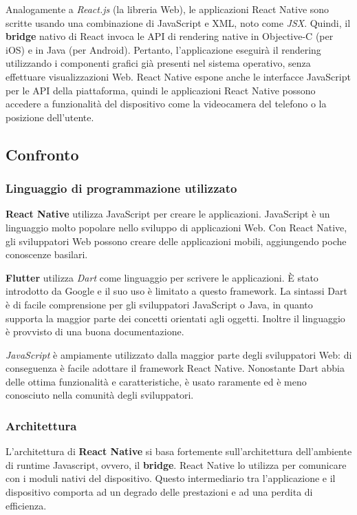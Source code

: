 Analogamente a \textit{React.js} (la libreria Web), le applicazioni React Native sono scritte usando una combinazione di JavaScript e XML, noto come \textit{JSX}. Quindi, il \textbf{bridge} nativo di React invoca le API di rendering native in Objective-C (per iOS) e in Java (per Android). Pertanto, l'applicazione eseguirà il rendering utilizzando i componenti grafici già presenti nel sistema operativo, senza effettuare visualizzazioni Web. React Native espone anche le interfacce JavaScript per le API della piattaforma, quindi le applicazioni React Native possono accedere a funzionalità del dispositivo come la videocamera del telefono o la posizione dell'utente.

\subsection{Confronto}

\subsubsection{Linguaggio di programmazione utilizzato}
\textbf{React Native} utilizza JavaScript per creare le applicazioni. JavaScript è un linguaggio molto popolare nello sviluppo di applicazioni Web. Con React Native, gli sviluppatori Web possono creare delle applicazioni mobili, aggiungendo poche conoscenze basilari.

\textbf{Flutter} utilizza \textit{Dart} come linguaggio per scrivere le applicazioni. È stato introdotto da Google e il suo uso è limitato a questo framework. La sintassi Dart è di facile comprensione per gli sviluppatori JavaScript o Java, in quanto supporta la maggior parte dei concetti orientati agli oggetti. Inoltre il linguaggio è provvisto di una buona documentazione.

\textit{JavaScript} è ampiamente utilizzato dalla maggior parte degli sviluppatori Web: di conseguenza è facile adottare il framework React Native. Nonostante Dart abbia delle ottima funzionalità e caratteristiche, è usato raramente ed è meno conosciuto nella comunità degli sviluppatori.

\subsubsection{Architettura}
L'architettura di \textbf{React Native} si basa fortemente sull'architettura dell'ambiente di runtime Javascript, ovvero, il \textbf{bridge}. React Native lo utilizza per comunicare con i moduli nativi del dispositivo. Questo intermediario tra l'applicazione e il dispositivo comporta ad un degrado delle prestazioni e ad una perdita di efficienza.

